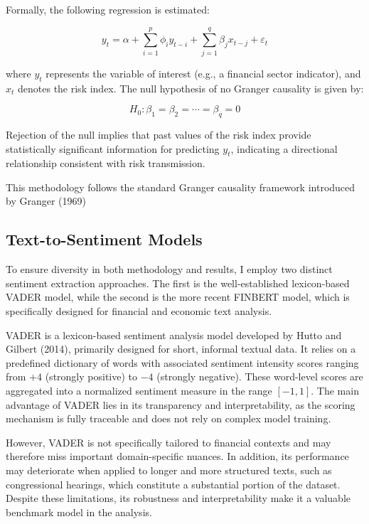 \documentclass[12pt,a4paper]{report}
\begin{document}
Formally, the following regression is estimated:

\begin{equation}
y_t = \alpha + \sum_{i=1}^{p} \phi_i y_{t-i} + \sum_{j=1}^{q} \beta_j x_{t-j} + \varepsilon_t
\end{equation}

where \( y_t \) represents the variable of interest (e.g., a financial sector indicator), and 
\( x_t \) denotes the risk index. The null hypothesis of no Granger causality is given by:

\begin{equation}
H_0: \beta_1 = \beta_2 = \cdots = \beta_q = 0
\end{equation}

Rejection of the null implies that past values of the risk index provide statistically significant
information for predicting \( y_t \), indicating a directional relationship consistent with risk
transmission.

This methodology follows the standard Granger causality framework introduced by Granger (1969)

\subsection{Text-to-Sentiment Models}

To ensure diversity in both methodology and results, I employ two distinct sentiment extraction
approaches. The first is the well-established lexicon-based VADER model, while the second is the
more recent FINBERT model, which is specifically designed for financial and economic text analysis.

VADER is a lexicon-based sentiment analysis model developed by Hutto and Gilbert (2014), primarily
designed for short, informal textual data. It relies on a predefined dictionary of words with
associated sentiment intensity scores ranging from $+4$ (strongly positive) to $-4$ (strongly
negative). These word-level scores are aggregated into a normalized sentiment measure in the range
$[-1,1]$. The main advantage of VADER lies in its transparency and interpretability, as the scoring
mechanism is fully traceable and does not rely on complex model training.

However, VADER is not specifically tailored to financial contexts and may therefore miss important
domain-specific nuances. In addition, its performance may deteriorate when applied to longer and more
structured texts, such as congressional hearings, which constitute a substantial portion of the
dataset. Despite these limitations, its robustness and interpretability make it a valuable benchmark
model in the analysis.
\end{document}
